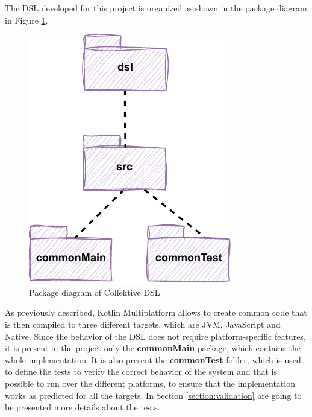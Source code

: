 The DSL developed for this project is organized as shown in the package diagram in Figure \ref{fig:dsl_packege_diagram}.
\begin{figure}[!ht]
    \centering
    \includegraphics[scale=1]{document/chapters/4-collektive/images/dsl_package_diagram.pdf}
    \caption{Package diagram of Collektive DSL}
    \label{fig:dsl_packege_diagram}
\end{figure}
As previously described, Kotlin Multiplatform allows to create common code that is then compiled to three different targets, which are JVM, JavaScript and Native. Since the behavior of the DSL does not require platform-specific features, it is present in the project only the \textbf{commonMain} package, which contains the whole implementation.\newline
It is also present the \textbf{commonTest} folder, which is used to define the tests to verify the correct behavior of the system and that is possible to run over the different platforms, to ensure that the implementation works as predicted for all the targets. In Section \ref{section:validation} are going to be presented more details about the tests.

